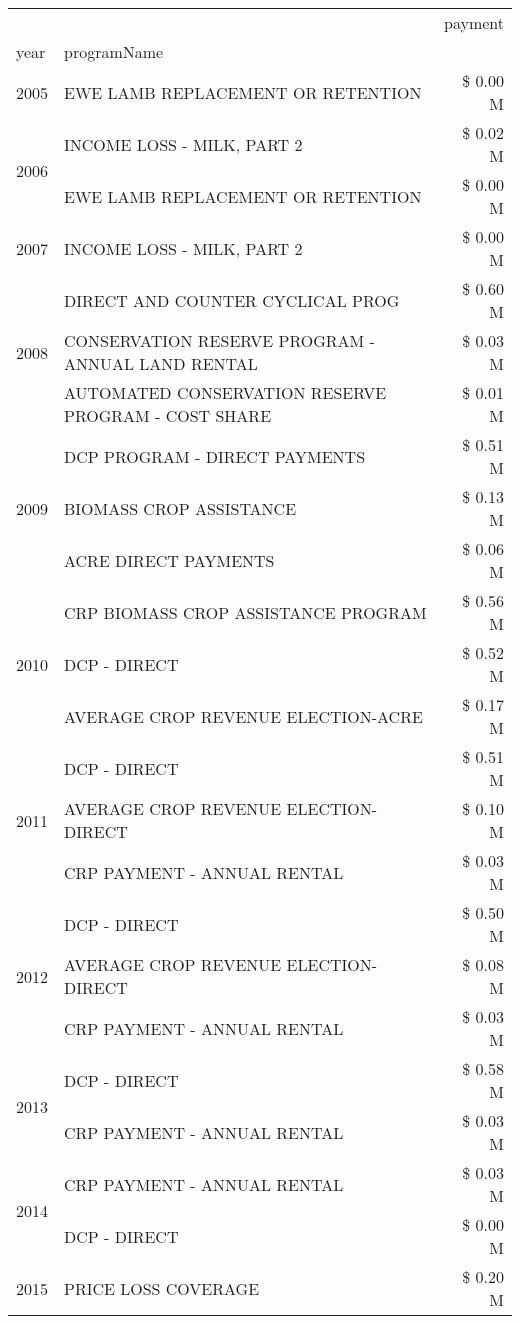 \begin{tabular}{llr}
\toprule
 &  & payment \\
year & programName &  \\
\midrule
2005 & EWE LAMB REPLACEMENT OR RETENTION & \$ 0.00 M \\
\cline{1-3}
\multirow[t]{2}{*}{2006} & INCOME LOSS - MILK, PART 2 & \$ 0.02 M \\
 & EWE LAMB REPLACEMENT OR RETENTION & \$ 0.00 M \\
\cline{1-3}
2007 & INCOME LOSS - MILK, PART 2 & \$ 0.00 M \\
\cline{1-3}
\multirow[t]{3}{*}{2008} & DIRECT AND COUNTER CYCLICAL PROG & \$ 0.60 M \\
 & CONSERVATION RESERVE PROGRAM - ANNUAL LAND RENTAL & \$ 0.03 M \\
 & AUTOMATED CONSERVATION RESERVE PROGRAM - COST SHARE & \$ 0.01 M \\
\cline{1-3}
\multirow[t]{3}{*}{2009} & DCP PROGRAM - DIRECT PAYMENTS & \$ 0.51 M \\
 & BIOMASS CROP ASSISTANCE & \$ 0.13 M \\
 & ACRE DIRECT PAYMENTS & \$ 0.06 M \\
\cline{1-3}
\multirow[t]{3}{*}{2010} & CRP BIOMASS CROP ASSISTANCE PROGRAM & \$ 0.56 M \\
 & DCP - DIRECT & \$ 0.52 M \\
 & AVERAGE CROP REVENUE ELECTION-ACRE & \$ 0.17 M \\
\cline{1-3}
\multirow[t]{3}{*}{2011} & DCP - DIRECT & \$ 0.51 M \\
 & AVERAGE CROP REVENUE ELECTION-DIRECT & \$ 0.10 M \\
 & CRP PAYMENT - ANNUAL RENTAL & \$ 0.03 M \\
\cline{1-3}
\multirow[t]{3}{*}{2012} & DCP - DIRECT & \$ 0.50 M \\
 & AVERAGE CROP REVENUE ELECTION-DIRECT & \$ 0.08 M \\
 & CRP PAYMENT - ANNUAL RENTAL & \$ 0.03 M \\
\cline{1-3}
\multirow[t]{2}{*}{2013} & DCP - DIRECT & \$ 0.58 M \\
 & CRP PAYMENT - ANNUAL RENTAL & \$ 0.03 M \\
\cline{1-3}
\multirow[t]{2}{*}{2014} & CRP PAYMENT - ANNUAL RENTAL & \$ 0.03 M \\
 & DCP - DIRECT & \$ 0.00 M \\
\cline{1-3}
\multirow[t]{3}{*}{2015} & PRICE LOSS COVERAGE & \$ 0.20 M \\

\end{tabular}
